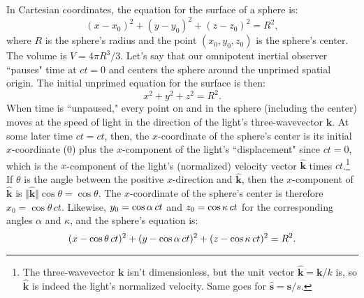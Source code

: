 \documentclass[12pt]{article}
\renewcommand{\vv}[1]{\mathbf{#1}}
\begin{document}
In Cartesian coordinates, the equation for the surface of a sphere is:
\begin{equation*}
(x - x_0)^2 + (y - y_0)^2 + (z - z_0)^2 = R^2,
\end{equation*}
where $R$ is the sphere's radius and the point $(x_0, y_0, z_0)$ is the sphere's center. The volume is $V = 4 \pi R^3 / 3$. Let's say that our omnipotent inertial observer ``pauses" time at ${ct = 0}$ and centers the sphere around the unprimed spatial origin. The initial unprimed equation for the surface is then:
\begin{equation*}
x^2 + y^2 + z^2 = R^2.
\end{equation*}
When time is ``unpaused," every point on and in the sphere (including the center) moves at the speed of light in the direction of the light's three-wavevector $\vv k$. At some later time $ct = ct$, then, the $x$-coordinate of the sphere's center is its initial $x$-coordinate ($0$) plus the $x$-component of the light's ``displacement" since $ct = 0$, which is the $x$-component of the light's (normalized) velocity vector $\vv{\hat{k}}$ times $ct$.\footnote{The three-wavevector $\vv k$ isn't dimensionless, but the unit vector $\vv{\hat{k}} = \vv k / k$ is, so $\vv{\hat{k}}$ is indeed the light's normalized velocity. Same goes for $\vv{\hat s} = \vv s / s$.} If $\theta$ is the angle between the positive $x$-direction and $\vv{\hat{k}}$, then the $x$-component of $\vv{\hat{k}}$ is $\Vert \vv{\hat{k}} \Vert \cos{\theta} = \cos{\theta}$. The $x$-coordinate of the sphere's center is therefore $x_0 = \cos{\theta} \, ct$. Likewise, $y_0 = \cos{\alpha} \, \mkern.5mu ct$ and $z_0 = \cos{\kappa} \, \mkern.5mu ct$ for the corresponding angles $\alpha$ and $\kappa$, and the sphere's equation is:
\begin{equation*}
(x - \cos{\theta} \, ct)^2 + (y - \cos{\alpha} \, \mkern.5mu ct)^2 + (z - \cos{\kappa} \, \mkern.5mu ct)^2 = R^2 .
\end{equation*}
\end{document}
